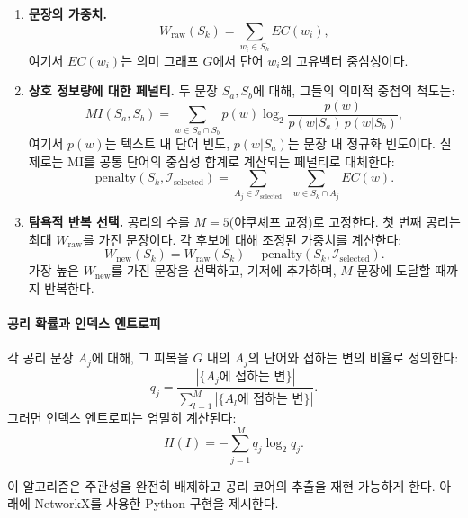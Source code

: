 \documentclass[11pt,a4paper]{article}
\begin{document}
	\begin{enumerate}
		\item \textbf{문장의 가중치.}
		\[
		W_{\text{raw}}(S_k) = \sum_{w_i \in S_k} EC(w_i),
		\]
		여기서 \(EC(w_i)\)는 의미 그래프 \(G\)에서 단어 \(w_i\)의 고유벡터 중심성이다.
		
		\item \textbf{상호 정보량에 대한 페널티.}
		두 문장 \(S_a, S_b\)에 대해, 그들의 의미적 중첩의 척도는:
		\[
		MI(S_a, S_b) = \sum_{w \in S_a \cap S_b} p(w) \log_2 \frac{p(w)}{p(w|S_a)\, p(w|S_b)},
		\]
		여기서 \(p(w)\)는 텍스트 내 단어 빈도, \(p(w|S_a)\)는 문장 내 정규화 빈도이다. 실제로는 MI를 공통 단어의 중심성 합계로 계산되는 페널티로 대체한다:
		\[
		\text{penalty}(S_k, \mathcal{I}_{\text{selected}}) = \sum_{A_j \in \mathcal{I}_{\text{selected}}} \;\; \sum_{w \in S_k \cap A_j} EC(w).
		\]
		
		\item \textbf{탐욕적 반복 선택.}
		공리의 수를 \(M = 5\)(야쿠셰프 교정)로 고정한다. 첫 번째 공리는 최대 \(W_{\text{raw}}\)를 가진 문장이다. 각 후보에 대해 조정된 가중치를 계산한다:
		\[
		W_{\text{new}}(S_k) = W_{\text{raw}}(S_k) - \text{penalty}(S_k, \mathcal{I}_{\text{selected}}).
		\]
		가장 높은 \(W_{\text{new}}\)를 가진 문장을 선택하고, 기저에 추가하며, \(M\) 문장에 도달할 때까지 반복한다.
	\end{enumerate}
	
	\paragraph{공리 확률과 인덱스 엔트로피}
	각 공리 문장 \(A_j\)에 대해, 그 피복을 \(G\) 내의 \(A_j\)의 단어와 접하는 변의 비율로 정의한다:
	\[
	q_j = \frac{|\{\text{\(A_j\)에 접하는 변}\}|}{\sum_{l=1}^M |\{\text{\(A_l\)에 접하는 변}\}|}.
	\]
	그러면 인덱스 엔트로피는 엄밀히 계산된다:
	\[
	H(I) = -\sum_{j=1}^{M} q_j \log_2 q_j.
	\]
	
	이 알고리즘은 주관성을 완전히 배제하고 공리 코어의 추출을 재현 가능하게 한다. 아래에 NetworkX를 사용한 Python 구현을 제시한다.
	
\end{document}
